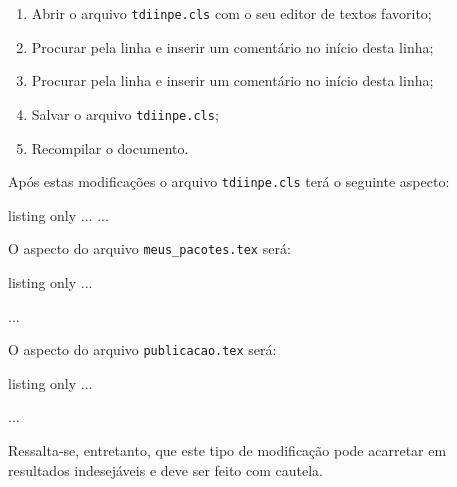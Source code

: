 \begingroup
\renewcommand{\labelenumi}{\arabic{enumi}.}
\begin{enumerate}
	\item Abrir o arquivo {\tt tdiinpe.cls} com o seu editor de textos favorito;
	\item Procurar pela linha \texttt{\RequirePackage{subfigure}} e inserir um comentário no início desta linha;
	\item Procurar pela linha \texttt{\RequirePackage[subfigure]{tocloft}} e inserir um comentário no início desta linha;
	\item Salvar o arquivo {\tt tdiinpe.cls};
	\item Recompilar o documento.
\end{enumerate}
\endgroup

Após estas modificações o arquivo {\tt tdiinpe.cls} terá o seguinte aspecto:

\begin{texexp}{listing only}
...
\RequirePackage{amsmath,amssymb,amsthm} %
\RequirePackage{makeidx} %
\RequirePackage{eso-pic}
...
\end{texexp}

O aspecto do arquivo {\tt meus\_pacotes.tex} será:

\begin{texexp}{listing only}
...
\usepackage{subfig}
...
\end{texexp}

O aspecto do arquivo {\tt publicacao.tex} será:

\begin{texexp}{listing only}
...


 



\makeindex  

 
...
\end{texexp}

\begin{marker}
Ressalta-se, entretanto, que este tipo de modificação pode acarretar em resultados indesejáveis e deve ser feito com cautela. 
\end{marker}

